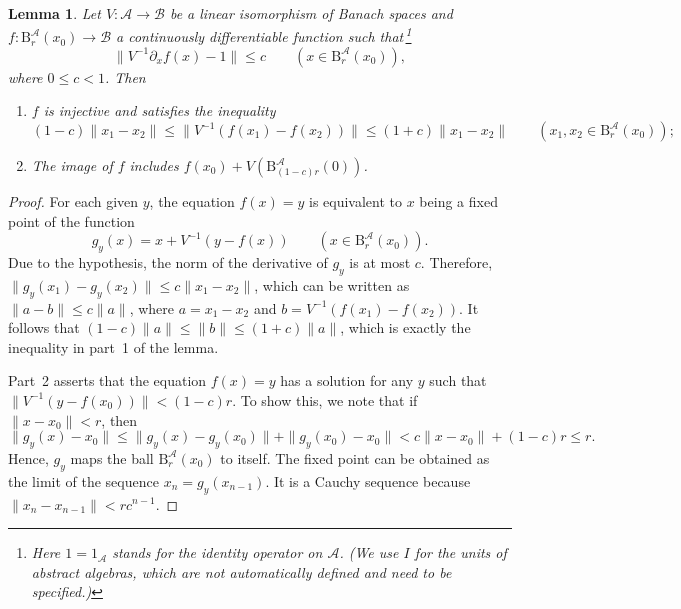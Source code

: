 \documentclass[12pt]{article}
\newcommand{\calA}{\mathcal{A}}
\newcommand{\calB}{\mathcal{B}}
\newcommand{\Ba}{\mathrm{B}}
\renewcommand{\le}{\leqslant}
\newtheorem{Lemma}[Theorem]{Lemma}
\newtheorem[definition]{Definition}[Theorem]{Definition}
\newtheorem[remark]{Example}[Theorem]{Example}
\newtheorem[remark]{Remark}[Theorem]{Remark}
\newtheorem[remark]{Question}[Theorem]{Open question}
\newtheorem*[definition]{definition}{Definition}
\newtheorem*[remark]{example}{Example}
\newtheorem*[remark]{remark}{Remark}
\newtheorem*[remark]{question}{Open question}
\numberwithin{equation}{section}
\begin{document}
\begin{Lemma}\label{lem_invfun}
Let $V\colon \calA\to\calB$ be a linear isomorphism of Banach spaces and $f\colon \Ba^\calA_r(x_0)\to\calB$ a continuously differentiable function such that\,\footnote{Here $1=1_\calA$ stands for the identity operator on $\calA$. (We use $I$ for the units of abstract algebras, which are not automatically defined and need to be specified.)}
\[
\|V^{-1}\partial_{x}f(x)-1\|\le c\qquad (x\in\Ba^\calA_r(x_0)),
\]
where $0\le c<1$. Then
\begin{enumerate}
\item $f$ is injective and satisfies the inequality
\[
(1-c)\|x_1-x_2\|\le \|V^{-1}(f(x_1)-f(x_2))\|\le (1+c)\|x_1-x_2\|\qquad
(x_1,x_2\in\Ba^\calA_r(x_0));
\]
\item The image of $f$ includes $f(x_0)+V(\Ba^\calA_{(1-c)r}(0))$.
\end{enumerate}
\end{Lemma}
\begin{proof}
For each given $y$, the equation $f(x)=y$ is equivalent to $x$ being a fixed point of the function
\[
g_y(x)=x+V^{-1}(y-f(x))\qquad (x\in\Ba^\calA_r(x_0)).
\]
Due to the hypothesis, the norm of the derivative of $g_y$ is at most $c$. Therefore, $\|g_y(x_1)-g_y(x_2)\|\le c\|x_1-x_2\|$, which can be written as $\|a-b\|\le c\|a\|$, where $a=x_1-x_2$ and $b=V^{-1}(f(x_1)-f(x_2))$. It follows that $(1-c)\|a\|\le\|b\|\le(1+c)\|a\|$, which is exactly the inequality in part~1 of the lemma.

Part~2 asserts that the equation $f(x)=y$ has a solution for any $y$ such that $\|V^{-1}(y-f(x_0))\|<(1-c)r$. To show this, we note that if $\|x-x_0\|<r$, then
\[
\|g_y(x)-x_0\| \le \|g_y(x)-g_y(x_0)\|+\|g_y(x_0)-x_0\|
< c\|x-x_0\|+(1-c)r \le r.
\]
Hence, $g_y$ maps the ball $\Ba^\calA_r(x_0)$ to itself. The fixed point can be obtained as the limit of the sequence $x_n=g_y(x_{n-1})$. It is a Cauchy sequence because $\|x_{n}-x_{n-1}\|<rc^{n-1}$.
\end{proof}
\end{document}
